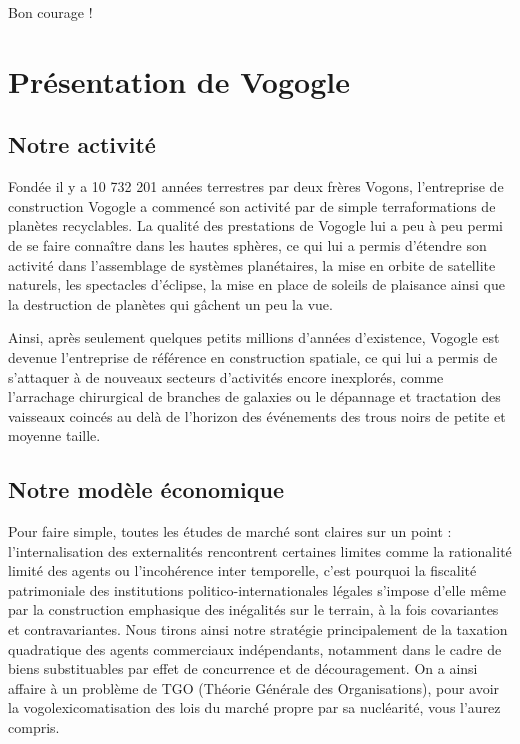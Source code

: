 Bon courage !

\newpage

\section{Présentation de Vogogle}

\subsection{Notre activité}

Fondée il y a 10 732 201 années terrestres par deux frères Vogons, l'entreprise
de construction Vogogle a commencé son activité par de simple terraformations
de planètes recyclables. La qualité des prestations de Vogogle lui a peu à peu
permi de se faire connaître dans les hautes sphères, ce qui lui a permis
d'étendre son activité dans l'assemblage de systèmes planétaires, la mise en
orbite de satellite naturels, les spectacles d'éclipse, la mise en place de
soleils de plaisance ainsi que la destruction de planètes qui gâchent un peu
la vue.

Ainsi, après seulement quelques petits millions d'années d'existence, Vogogle
est devenue l'entreprise de référence en construction spatiale, ce qui lui a
permis de s'attaquer à de nouveaux secteurs d'activités encore inexplorés,
comme l'arrachage chirurgical de branches de galaxies ou le dépannage et
tractation des vaisseaux coincés au delà de l'horizon des événements des trous
noirs de petite et moyenne taille.

\subsection{Notre modèle économique}

Pour faire simple, toutes les études de marché sont claires sur un point :
l'internalisation des externalités rencontrent certaines limites comme la
rationalité limité des agents ou l'incohérence inter temporelle, c'est pourquoi
la fiscalité patrimoniale des institutions politico-internationales légales
s'impose d'elle même par la construction emphasique des inégalités sur le
terrain, à la fois covariantes et contravariantes. Nous tirons ainsi notre
stratégie principalement de la taxation quadratique des agents commerciaux
indépendants, notamment dans le cadre de biens substituables par effet de
concurrence et de découragement. On a ainsi affaire à un problème de TGO
(Théorie Générale des Organisations), pour avoir la vogolexicomatisation des
lois du marché propre par sa nucléarité, vous l'aurez compris.

